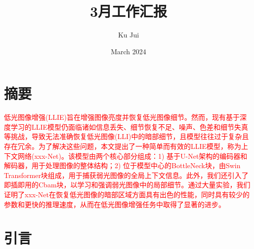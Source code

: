 \documentclass[a4paper]{ctexart}
\begin{document}
	
	
	\title{\songti {}3月工作汇报}
	\author{\textrm{Ku Jui}}
	\date{\textrm{March 2024}}
	\maketitle
	
	\renewcommand{\figurename}{Figure} %
	
	\renewcommand{\tablename}{Table}
	
	\renewcommand{\cfttoctitlefont}{\hfill\Large\bfseries\songti}
	\renewcommand{\cftaftertoctitle}{\hfill}
	\renewcommand{\contentsname}{Content}
		
	\tableofcontents
	
	\newpage	
	
	\section{摘要}
	
		\textcolor{red}{低光图像增强(LLIE)旨在增强图像亮度并恢复低光图像细节。然而，现有基于深度学习的LLIE模型仍面临诸如信息丢失、细节恢复不足、噪声、色差和细节失真等挑战，导致无法准确恢复低光图像(LLI)中的暗部细节，且模型往往过于复杂且存在冗余。为了解决这些问题，本文提出了一种简单而有效的LLIE模型，称为上下文网络(xxx-Net)。该模型由两个核心部分组成：1) 基于U-Net架构的编码器和解码器，用于处理图像的整体结构；2) 位于模型中心的BottleNeck块，由Swin Transformer块组成，用于捕获弱光图像的全局上下文信息。此外，我们还引入了即插即用的Cbam块，以学习和强调弱光图像中的局部细节。通过大量实验，我们证明了xxx-Net在恢复低光图像的暗部区域方面具有出色的性能，同时具有较少的参数和更快的推理速度，从而在低光图像增强任务中取得了显著的进步。}
	
	\section{引言}
		
\end{document}
